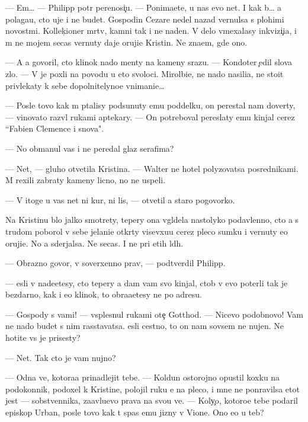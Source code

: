 \documentclass[10pt]{book}
\begin{document}
— Em… — Philipp pot{\e}r perenosi{\c}u. — Ponima{\y}ete, u nas {\y}evo net. I kak b{\yi}… {\y}a polaga{\y}u, cto uje i ne budet. Gospodin Cezare nedel{\iu} nazad vernulsa s plohimi novost{\ia}mi. Kollek{\c}ioner m{\e}rtv, kamni tak i ne na{\y}den{\yi}. V delo vmexalasy inkvizi{\c}i{\y}a, i m{\yi} ne mojem se{\y}cas vernuty daje oruji{\y}e Kristin{\yi}. Ne zna{\y}em, gde ono.

— A {\y}a govoril, cto klinok nado men{\ia}ty na kameny srazu. — Kondot{\y}er {\c}edil slova zlo. — V{\yi} je poxli na povodu u eto{\y} svoloci. Mirol{\iu}bi{\y}e, ne nado nasili{\y}a, ne sto{\y}it privlekaty k sebe dopolnitelyno{\y}e vnimani{\y}e…

— Posle tovo kak m{\yi} p{\yi}talisy podsunuty {\y}emu poddelku, on perestal nam dover{\ia}ty, — vinovato razv{\e}l rukami aptekary. — On potreboval pereslaty {\y}emu kinjal cerez ``Fabien Clemence i s{\yi}nov{\y}a".

— No obmanul vas i ne peredal glaz serafima?

— Net, — gluho otvetila Kristina. — Walter ne hotel polyzovatsa posrednikami. M{\yi} rexili zabraty kameny licno, no ne uspeli.

— V itoge u vas net ni kur, ni lis{\yi}, — otvetil {\y}a staro{\y} pogovorko{\y}.

Na Kristinu b{\yi}lo jalko smotrety, tepery ona v{\yi}gl{\ia}dela nastolyko podavlenno{\y}, cto {\y}a s trudom poborol v sebe jelani{\y}e otkr{\yi}ty visevxu{\y}u cerez pleco sumku i vernuty {\y}e{\y}o oruji{\y}e. No {\y}a sderjalsa. Ne se{\y}cas. I ne pri etih l{\iu}d{\ia}h.

— Obrazno govor{\ia}, v{\yi} soverxenno prav{\yi}, — podtverdil Philipp.

— {\Y}esli v{\yi} nade{\y}etesy, cto tepery {\y}a dam vam svo{\y} kinjal, ctob{\yi} v{\yi} {\y}evo poter{\ia}li tak je bezdarno, kak i {\y}e{\y}o klinok, to obra{\x}a{\y}etesy ne po adresu.

— Gospody s vami! — vsplesnul rukami ote{\c} Gotthod. — Nicevo podobnovo! Vam ne nado budet s nim rasstavatsa. {\Y}esli cestno, to on nam sovsem ne nujen. Ne hotite vs{\e} je prisesty?

— Net. Tak cto je vam nujno?

— Odna ve{\x}, kotora{\y}a prinadlejit tebe. — Koldun ostorojno opustil koxku na podokonnik, podoxel k Kristine, polojil ruku {\y}e{\y} na pleco, i mne ne ponravilsa etot jest — sobstvennika, za{\y}avl{\ia}{\y}u{\x}evo prava na svo{\y}u ve{\x}. — Koly{\c}o, kotoro{\y}e tebe podaril {\y}episkop Urban, posle tovo kak t{\yi} spas {\y}emu jizny v Vione. Ono {\y}e{\x}o u teb{\ia}?
\end{document}

